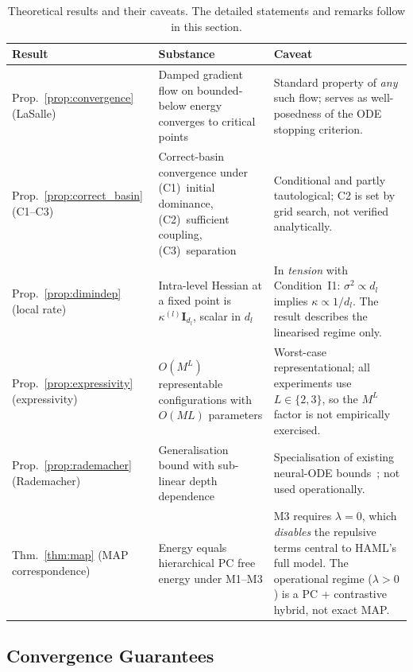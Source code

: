 \documentclass[11pt,a4paper]{article}
\begin{document}
\begin{table}[h]
\centering
\footnotesize
\setlength{\tabcolsep}{4pt}
\begin{tabular}{p{2.6cm} p{4.8cm} p{5.6cm}}
\toprule
\textbf{Result} & \textbf{Substance} & \textbf{Caveat} \\
\midrule
Prop.~\ref{prop:convergence} (LaSalle) & Damped gradient flow on bounded-below energy converges to critical points & Standard property of \emph{any} such flow; serves as well-posedness of the ODE stopping criterion. \\
\addlinespace
Prop.~\ref{prop:correct_basin} (C1--C3) & Correct-basin convergence under (C1)~initial dominance, (C2)~sufficient coupling, (C3)~separation & Conditional and partly tautological; C2 is set by grid search, not verified analytically. \\
\addlinespace
Prop.~\ref{prop:dimindep} (local rate) & Intra-level Hessian at a fixed point is $\kappa^{(l)}\mathbf{I}_{d_l}$, scalar in $d_l$ & In \emph{tension} with Condition~I1: $\sigma^2 \propto d_l$ implies $\kappa \propto 1/d_l$. The result describes the linearised regime only. \\
\addlinespace
Prop.~\ref{prop:expressivity} (expressivity) & $O(M^L)$ representable configurations with $O(ML)$ parameters & Worst-case representational; all experiments use $L \in \{2,3\}$, so the $M^L$ factor is not empirically exercised. \\
\addlinespace
Prop.~\ref{prop:rademacher} (Rademacher) & Generalisation bound with sub-linear depth dependence & Specialisation of existing neural-ODE bounds~\cite{hanson2024rademacher,marion2023generalization}; not used operationally. \\
\addlinespace
Thm.~\ref{thm:map} (MAP correspondence) & Energy equals hierarchical PC free energy under M1--M3 & M3 requires $\lambda = 0$, which \emph{disables} the repulsive terms central to HAML's full model. The operational regime ($\lambda > 0$) is a PC + contrastive hybrid, not exact MAP. \\
\bottomrule
\end{tabular}
\caption{Theoretical results and their caveats. The detailed statements and remarks
follow in this section.}
\label{tab:theory_caveats}
\end{table}

\subsection{Convergence Guarantees}
\label{sec:theory:convergence}
\end{document}
